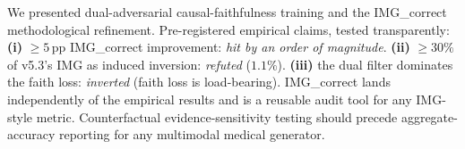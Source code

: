 \documentclass{article}
\begin{document}
We presented dual-adversarial causal-faithfulness training and the
IMG\_correct methodological refinement. Pre-registered empirical
claims, tested transparently: \textbf{(i)} $\geq 5$\,pp
IMG\_correct improvement: \emph{hit by an order of magnitude}.
\textbf{(ii)} $\geq 30\%$ of v5.3's IMG as induced inversion:
\emph{refuted} ($1.1\%$). \textbf{(iii)} the dual filter dominates
the faith loss: \emph{inverted} (faith loss is load-bearing).
IMG\_correct lands independently of the empirical results and is a
reusable audit tool for any IMG-style metric. Counterfactual
evidence-sensitivity testing should precede aggregate-accuracy
reporting for any multimodal medical generator.



\end{document}
